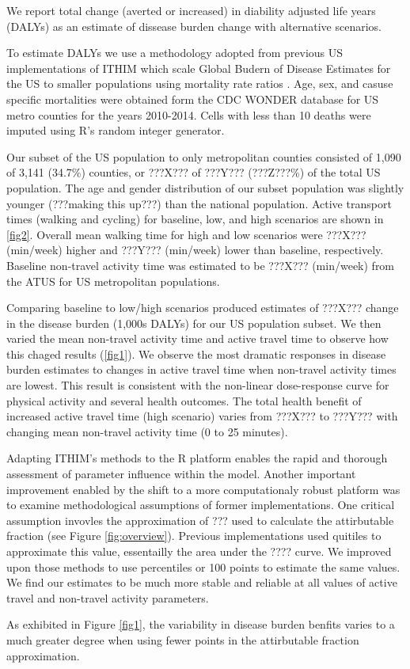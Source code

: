 We report total change (averted or increased) in diability adjusted
life years (DALYs) as an estimate of dissease burden change with
alternative scenarios.

To estimate DALYs we use a methodology adopted from previous US
implementations of ITHIM which scale Global Budern of Disease
Estimates for the US to smaller populations using mortality rate
ratios \cite{maizlish2013}. Age, sex, and casuse specific mortalities
were obtained form the CDC WONDER database for US metro counties for
the years 2010-2014. Cells with less than 10 deaths were imputed using
R's random integer generator.


Our subset of the US population to only metropolitan counties
consisted of 1,090 of 3,141 (34.7\%) counties, or ???X??? of ???Y???
(???Z???\%) of the total US population. The age and gender
distribution of our subset population was slightly younger (???making
this up???) than the national population. Active transport times
(walking and cycling) for baseline, low, and high scenarios are shown
in \ref{fig2}. Overall mean walking time for high and low
scenarios were ???X??? (min/week) higher and ???Y??? (min/week) lower
than baseline, respectively. Baseline non-travel activity time was
estimated to be ???X??? (min/week) from the ATUS for US metropolitan
populations.

Comparing baseline to low/high scenarios produced estimates of ???X???
change in the disease burden (1,000s DALYs) for our US population
subset. We then varied the mean non-travel activity time and active
travel time to observe how this chaged results (\ref{fig1}). We
observe the most dramatic responses in disease burden estimates to
changes in active travel time when non-travel activity times are
lowest. This result is consistent with the non-linear dose-response
curve for physical activity and several health outcomes. The total
health benefit of increased active travel time (high scenario) varies
from ???X??? to ???Y??? with changing mean non-travel activity time (0
to 25 minutes).

Adapting ITHIM's methods to the R platform enables the rapid and
thorough assessment of parameter influence within the model. Another
important improvement enabled by the shift to a more computationaly
robust platform was to examine methodological assumptions of former
implementations. One critical assumption invovles the approximation of
??? used to calculate the attirbutable fraction (see
Figure \ref{fig:overview}). Previous implementations used quitiles to
approximate this value, essentailly the area under the ???? curve. We
improved upon those methods to use percentiles or 100 points to
estimate the same values. We find our estimates to be much more stable
and reliable at all values of active travel and non-travel activity
parameters.

As exhibited in Figure \ref{fig1}, the variability in disease burden
benfits varies to a much greater degree when using fewer points in the
attirbutable fraction approximation.
